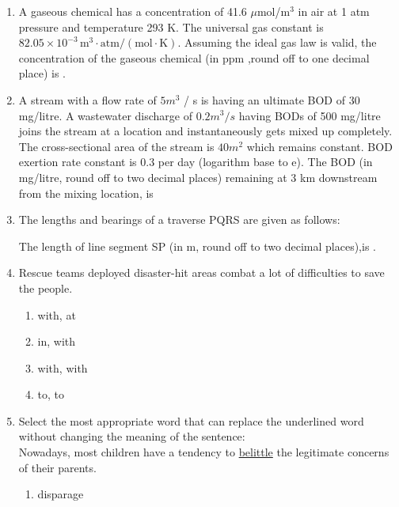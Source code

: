 \documentclass[journal,12pt,onecolumn]{IEEEtran}
\theoremstyle{remark}
\begin{document}
\begin{enumerate}
    \item A gaseous chemical has a concentration of 41.6 $\mu$mol/m$^3$ in air at 1 atm pressure and temperature 293 K. The universal gas constant is $82.05 \times 10^{-3} \, \text{m}^3 \cdot \text{atm} / (\text{mol} \cdot \text{K})$. Assuming the ideal gas law is valid, the concentration of the gaseous chemical (in ppm ,round off to one decimal place) is {\underline{\hspace{2cm}}}.

    \item A stream with a flow rate of $5m ^ 3$ / s is having an ultimate BOD of 30 mg/litre. A wastewater discharge of $0.2m ^ 3 / s$ having BODs of 500 mg/litre joins the stream at a location and instantaneously gets mixed up completely. The cross-sectional area of the stream is $40m ^ 2$ which remains constant. BOD exertion rate constant is 0.3 per day (logarithm base to e). The BOD (in mg/litre, round off to two decimal places) remaining at 3 km downstream from the mixing location, is
    \item The lengths and bearings of a traverse PQRS are given as follows:
   \begin{table}[H]
        \centering
          
    \end{table}
    The length of line segment SP (in m, round off to two decimal places),is {\underline{\hspace{2cm}}}.
    \item Rescue teams deployed {\underline{\hspace{2cm}}} disaster-hit areas combat {\underline{\hspace{2cm}}} a lot of difficulties to save the people. 
    \begin{enumerate}
        \item with, at
        \item in, with
        \item with, with
        \item to, to
    \end{enumerate}
    \item Select the most appropriate word that can replace the underlined word without changing the meaning of the sentence:\\Nowadays, most children have a tendency to \underline{belittle} the legitimate concerns of their parents.
    \begin{enumerate}
        \item disparage

\end{enumerate}
\end{enumerate}
\end{document}
